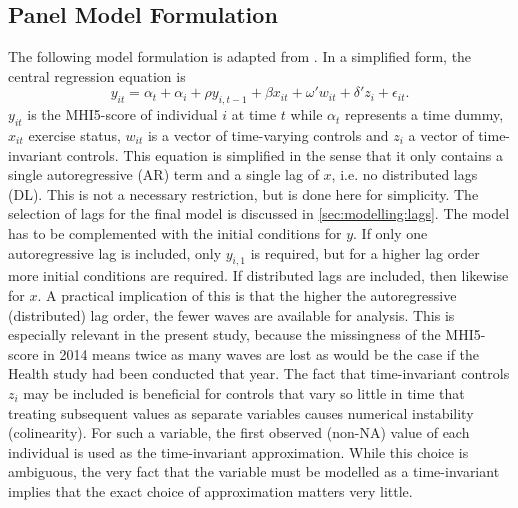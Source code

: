 \subsection{Panel Model Formulation}
\label{sec:methods:model_formulation}
The following model formulation is adapted from .
In a simplified form, the central regression equation is
\begin{equation}
    \label{eq:methods:model_formulation}
    y_{it} = \alpha_t + \alpha_i + \rho y_{i,t-1} + \beta x_{it} + \omega' w_{it} + \delta' z_i + \epsilon_{it}.
\end{equation}
$y_{it}$ is the MHI5-score of individual $i$ at time $t$ while $\alpha_t$ represents a time dummy,
$x_{it}$ exercise status, $w_{it}$ is a vector of time-varying controls and $z_i$ a vector of time-invariant controls.
This equation is simplified in the sense that it only contains a single autoregressive (AR) term and a single lag of $x$,
i.e. no distributed lags (DL). This is not a necessary restriction, but is done here for simplicity.
The selection of lags for the final model is discussed in \cref{sec:modelling:lags}. The model has to be complemented
with the initial conditions for $y$. If only one autoregressive lag is included, only $y_{i,1}$ is required,
but for a higher lag order more initial conditions are required. If distributed lags are included, then likewise for $x$.
A practical implication of this is that the higher the autoregressive (distributed) lag order, the fewer waves
are available for analysis. This is especially relevant in the present study, because the missingness of the MHI5-score
in 2014 means twice as many waves are lost as would be the case if the Health study had been conducted that year.
The fact that time-invariant controls $z_i$ may be included is beneficial for controls that vary so little in time that
treating subsequent values as separate variables causes numerical instability (colinearity). For such a variable,
the first observed (non-NA) value of each individual is used as the time-invariant approximation. While this choice
is ambiguous, the very fact that the variable must be modelled as a time-invariant implies that the exact
choice of approximation matters very little.

